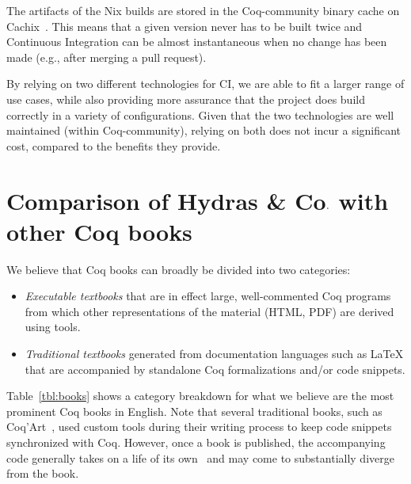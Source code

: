 \documentclass{easychair}
\newcommand{\community}{Coq-community\xspace}
\newcommand{\Hydras}{Hydras \& Co$\text.$\xspace}
\begin{document}
The artifacts of the Nix builds are stored in the \community binary cache on Cachix~\cite{cachix}.
%
This means that a given version never has to be built twice and Continuous Integration can be almost instantaneous when no change has been made (e.g., after merging a pull request).

By relying on two different technologies for CI, we are able to fit a larger range of use cases, while also providing more assurance that the project does build correctly in a variety of configurations.
%
Given that the two technologies are well maintained (within \community), relying on both does not incur a significant cost, compared to the benefits they provide.

\section{Comparison of \Hydras with other Coq books}

We believe that Coq books can broadly be divided into two categories:
\begin{itemize}
\item \emph{Executable textbooks} that are in effect large, well-commented Coq programs from which other representations of the material (HTML, PDF) are derived using tools.
\item \emph{Traditional textbooks} generated from documentation languages such as LaTeX that are accompanied by standalone Coq formalizations and/or code snippets.
\end{itemize}
Table~\ref{tbl:books} shows a category breakdown for what we believe are the most prominent Coq books in English. Note that several traditional books, such as Coq'Art~\cite{BC04}, used custom tools during their writing process to keep code snippets synchronized with Coq. However, once a book is published, the accompanying code generally takes on a life of its own~\cite{CoqArtCommunity} and may come to substantially diverge from the book.
\end{document}

